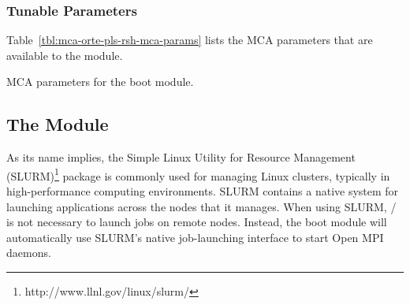 
\subsubsection{Tunable Parameters}


Table~\ref{tbl:mca-orte-pls-rsh-mca-params} lists the MCA parameters that
are available to the  module.


\begin{table}[htbp]
  \begin{ssiparamtb}
%
% 
     
%
%
%
  \end{ssiparamtb}
  \caption{MCA parameters for the  boot module.}
  \label{tbl:mca-orte-pls-rsh-mca-params}
\end{table}


\subsection{The  Module}


As its name implies, the Simple Linux Utility for Resource Management
(SLURM)\footnote{http://www.llnl.gov/linux/slurm/} package is commonly
used for managing Linux clusters, typically in high-performance
computing environments.  SLURM contains a native system for launching
applications across the nodes that it manages.  When using SLURM,
/ is not necessary to launch jobs on remote nodes.
Instead, the  boot module will automatically use SLURM's
native job-launching interface to start Open MPI daemons.

